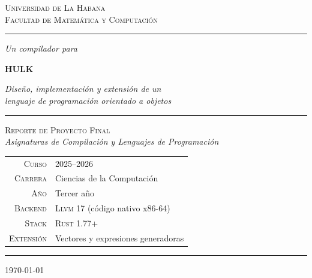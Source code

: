 \documentclass[11pt,a4paper,oneside,openany]{report}
\newcommand{\rust}{\textsc{Rust}}
\newcommand{\llvm}{\textsc{Llvm}}
\begin{document}

\begin{titlepage}
\thispagestyle{empty}
\centering
\vspace*{1cm}

{\scshape\large Universidad de La Habana\\[0.3em]
Facultad de Matemática y Computación\par}

\vspace{0.5cm}
{\color{halfgray}\rule{0.7\textwidth}{0.4pt}}
\vspace{2.5cm}

{\fontsize{36}{40}\selectfont\itshape Un compilador para \par}
\vspace{0.6cm}
{\fontsize{72}{72}\selectfont\bfseries\color{hulkblue} HULK \par}
\vspace{1.0cm}
{\Large\itshape Diseño, implementación y extensión de un \\[0.2em]
lenguaje de programación orientado a objetos\par}

\vspace{2.5cm}

{\color{halfgray}\rule{0.4\textwidth}{0.4pt}}
\vspace{0.8cm}

{\Large
\textsc{Reporte de Proyecto Final}\\[0.5em]
\textit{Asignaturas de Compilación y Lenguajes de Programación}\par}

\vspace{1.5cm}

\begin{tabular}{rl}
\textsc{Curso}      & 2025--2026 \\[2pt]
\textsc{Carrera}    & Ciencias de la Computación \\[2pt]
\textsc{Año}        & Tercer año \\[2pt]
\textsc{Backend}    & \llvm{} 17 (código nativo x86-64) \\[2pt]
\textsc{Stack}      & \rust{} 1.77+ \\[2pt]
\textsc{Extensión}  & Vectores y expresiones generadoras \\
\end{tabular}

\vfill
{\color{halfgray}\rule{0.7\textwidth}{0.4pt}}
\vspace{0.5em}
{\large \today \par}
\end{titlepage}
\end{document}
